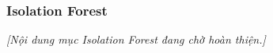 
\subsubsection{Isolation Forest}\label{subsubsec:isolation-forest}

\textit{[Nội dung mục Isolation Forest đang chờ hoàn thiện.]}
